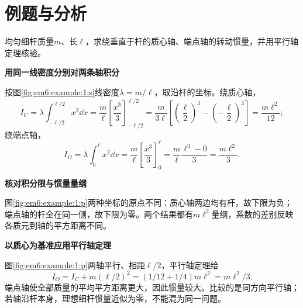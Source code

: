 \section{例题与分析}

\begin{question}\begin{example}[细杆绕不同轴的转动惯量]\label{em6:example:1}
均匀细杆质量$m$、长$\ell$，求绕垂直于杆的质心轴、端点轴的转动惯量，并用平行轴定理核验。
\end{example}
\end{question}
\begin{solution}\textbf{用同一线密度分别对两条轴积分}\par\nobreak
按图\ref{fig:em6:example:1:s}线密度$\lambda=m/\ell$，取沿杆的坐标。绕质心轴，
\[
I_C=\lambda\int_{-\ell/2}^{\ell/2}x^2\dd x
=\frac m\ell\left[\frac{x^3}{3}\right]_{-\ell/2}^{\ell/2}
=\frac m{3\ell}\left[\left(\frac\ell2\right)^3-\left(-\frac\ell2\right)^3\right]
=\frac{m\ell^2}{12};
\]
绕端点轴，
\[
I_O=\lambda\int_0^\ell x^2\dd x
=\frac m\ell\left[\frac{x^3}{3}\right]_0^\ell
=\frac m\ell\frac{\ell^3-0}{3}=\frac{m\ell^2}{3}.
\]




\par\medskip{}\noindent\textbf{核对积分限与惯量量纲}\par\nobreak
图\ref{fig:em6:example:1:p}两种坐标的原点不同：质心轴两边均有杆，故下限为负；端点轴的杆全在同一侧，故下限为零。两个结果都有$m\ell^2$量纲，系数的差别反映各质元到轴的平方距离不同。



\par\medskip{}\noindent\textbf{以质心为基准应用平行轴定理}\par\nobreak
图\ref{fig:em6:example:1:p}两轴平行、相距$\ell/2$，平行轴定理给
\[I_O=I_C+m(\ell/2)^2=(1/12+1/4)m\ell^2=\boxed{m\ell^2/3}.\]
端点轴使全部质量的平均平方距离更大，因此惯量较大。比较的是同方向平行轴；若轴沿杆本身，理想细杆惯量近似为零，不能混为同一问题。\end{solution}
